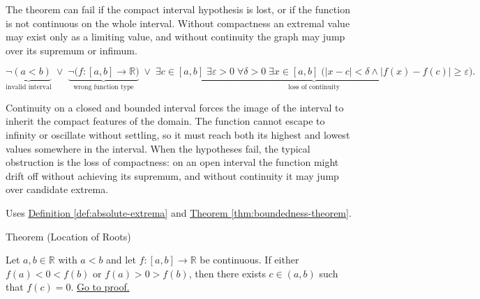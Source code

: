 \begin{remark*}
The theorem can fail if the compact interval hypothesis is lost, or if
the function is not continuous on the whole interval. Without compactness
an extremal value may exist only as a limiting value, and without
continuity the graph may jump over its supremum or infimum.
\end{remark*}

\begin{remark*}
\[
\underbrace{\neg(a<b)}_{\text{invalid interval}}
\;\lor\;
\underbrace{\neg\bigl(f:[a,b]\to\mathbb{R}\bigr)}_{\text{wrong function type}}
\;\lor\;
\underbrace{\exists c\in[a,b]\;\exists \varepsilon>0\;\forall \delta>0\;\exists x\in[a,b]\;
\bigl(|x-c|<\delta\land |f(x)-f(c)|\ge\varepsilon\bigr)}_{\text{loss of continuity}}.
\]
\end{remark*}

\begin{remark*}[Interpretation]
Continuity on a closed and bounded interval forces the image of the interval to inherit the compact features of the domain. The function cannot escape to infinity or oscillate without settling, so it must reach both its highest and lowest values somewhere in the interval. When the hypotheses fail, the typical obstruction is the loss of compactness: on an open interval the function might drift off without achieving its supremum, and without continuity it may jump over candidate extrema.
\end{remark*}

\begin{remark*}[Dependencies]
Uses \hyperref[def:absolute-extrema]{Definition \ref{def:absolute-extrema}} and \hyperref[thm:boundedness-theorem]{Theorem \ref{thm:boundedness-theorem}}.
\end{remark*}


\begin{theorembox}{Theorem (Location of Roots)}
\begin{theorem}
\label{thm:location-of-roots}
Let $a,b \in \mathbb{R}$ with $a<b$ and let $f:[a,b]\to\mathbb{R}$ be continuous. If either $f(a)<0<f(b)$ or $f(a)>0>f(b)$, then there exists $c\in(a,b)$ such that $f(c)=0$.
\hyperref[prf:location-of-roots]{Go to proof.}
\end{theorem}
\end{theorembox}

